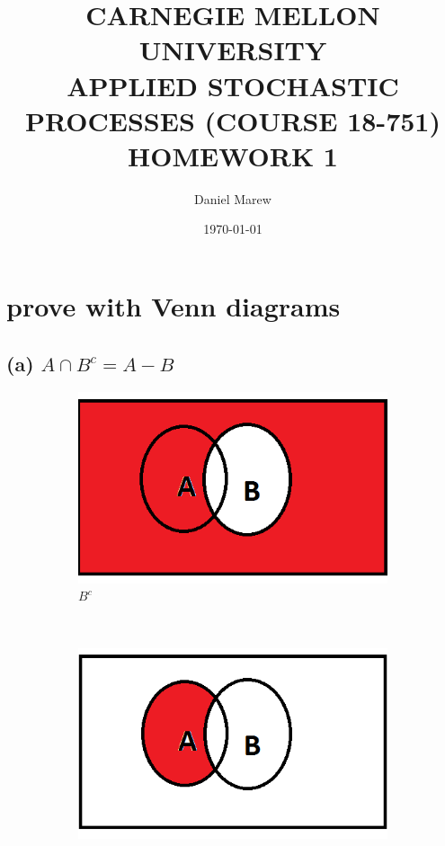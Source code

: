 \documentclass[a4paper,11pt]{article}
\begin{document}
\title{\color{red}CARNEGIE MELLON UNIVERSITY\\
APPLIED STOCHASTIC PROCESSES  (COURSE 18-751)\\
HOMEWORK 1}
\author{Daniel Marew}
\date{\today}
\maketitle
\newpage
\section{prove with Venn diagrams}
\subsection*{(a) $A \cap B^c = A-B$}
\begin{figure}[h]
    \centering
    \begin{subfigure}[b]{0.25\textwidth}
        \includegraphics[width=\textwidth]{BC}
        \caption{$B^c$}
    \end{subfigure}
 ~
    \begin{subfigure}[b]{0.25\textwidth}
        \includegraphics[width=\textwidth]{AnBc}

\end{subfigure}
\end{figure}
\end{document}
